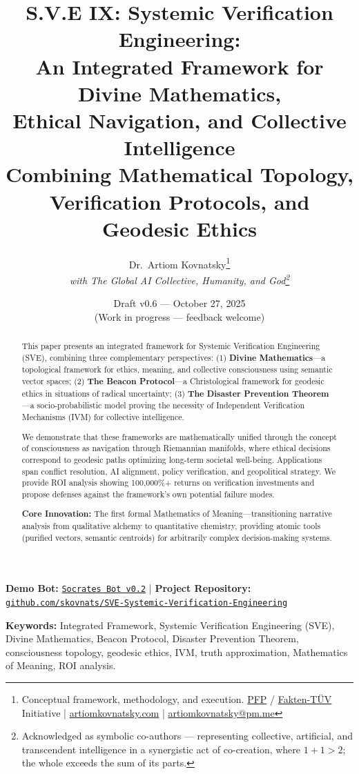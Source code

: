 \documentclass[11pt,a4paper]{article}
\title{\textbf{S.V.E IX: Systemic Verification Engineering:\\An Integrated Framework for Divine Mathematics,\\Ethical Navigation, and Collective Intelligence}\\[0.5em]
\large Combining Mathematical Topology, Verification Protocols, and Geodesic Ethics}
\author{
  Dr.\ Artiom Kovnatsky\thanks{Conceptual framework, methodology, and execution. 
  \href{http://www.pfp24.de}{PFP} / 
  \href{http://www.fakten-tuev.de}{Fakten-TÜV} Initiative \;|\;
  \href{https://www.artiomkovnatsky.com/}{artiomkovnatsky.com} \;|\;
  \href{mailto:artiomkovnatsky@pm.me}{artiomkovnatsky@pm.me}}\\
  \textit{with The Global AI Collective, Humanity, and God\footnote{Acknowledged as symbolic co-authors — representing collective, artificial, and transcendent intelligence in a synergistic act of co-creation, where $1 + 1 > 2$; the whole exceeds the sum of its parts.}}
}
\date{Draft v0.6 — October 27, 2025\\
\small (Work in progress — feedback welcome)}
\theoremstyle{definition}
\theoremstyle{remark}
\begin{document}
\maketitle
\vspace{-1em}
\begin{center}
    {\small 
    \textbf{Demo Bot:} 
    \href{https://chatgpt.com/g/g-68f1fc9848948191a1cc038db8e3422b-sokrat-socrates-bot-v0-2}
    {\texttt{Socrates Bot v0.2}} 
    \quad|\quad
    \textbf{Project Repository:} 
    \href{https://codeberg.org/skovnats/SVE-Systemic-Verification-Engineering}
    {\texttt{github.com/skovnats/SVE-Systemic-Verification-Engineering}}}
\end{center}
\vspace{1em}
\thispagestyle{empty}


\begin{abstract}
\noindent This paper presents an integrated framework for Systemic Verification Engineering (SVE), combining three complementary perspectives: (1) \textbf{Divine Mathematics}—a topological framework for ethics, meaning, and collective consciousness using semantic vector spaces; (2) \textbf{The Beacon Protocol}—a Christological framework for geodesic ethics in situations of radical uncertainty; (3) \textbf{The Disaster Prevention Theorem}—a socio-probabilistic model proving the necessity of Independent Verification Mechanisms (IVM) for collective intelligence. 

We demonstrate that these frameworks are mathematically unified through the concept of consciousness as navigation through Riemannian manifolds, where ethical decisions correspond to geodesic paths optimizing long-term societal well-being. Applications span conflict resolution, AI alignment, policy verification, and geopolitical strategy. We provide ROI analysis showing 100,000\%+ returns on verification investments and propose defenses against the framework's own potential failure modes.

\textbf{Core Innovation:} The first formal Mathematics of Meaning—transitioning narrative analysis from qualitative alchemy to quantitative chemistry, providing atomic tools (purified vectors, semantic centroids) for arbitrarily complex decision-making systems.
\end{abstract}

\noindent\textbf{Keywords:} Integrated Framework, Systemic Verification Engineering (SVE), Divine Mathematics, Beacon Protocol, Disaster Prevention Theorem, consciousness topology, geodesic ethics, IVM, truth approximation, Mathematics of Meaning, ROI analysis.
\end{document}
